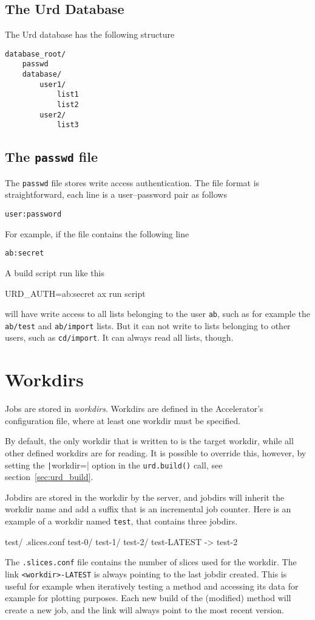 \subsection{The Urd Database}
The Urd database has the following structure
\begin{verbatim}
database_root/
    passwd
    database/
        user1/
            list1
            list2
        user2/
            list3
\end{verbatim}



\subsection{The \texttt{passwd} file}
The \texttt{passwd} file stores write access authentication.  The file
format is straightforward, each line is a user--password pair as follows
\begin{verbatim}
user:password
\end{verbatim}
For example, if the file contains the following line
\begin{verbatim}
ab:secret
\end{verbatim}
A build script run like this
\begin{shell}
URD_AUTH=ab:secret ax run script
\end{shell}
will have write access to all lists belonging to the user \texttt{ab},
such as for example the \texttt{ab/test} and \texttt{ab/import} lists.
But it can not write to lists belonging to other users, such as
\texttt{cd/import}.  It can always read all lists, though.



\section{Workdirs}
Jobs are stored in \textsl{workdirs}.  Workdirs are defined in the
Accelerator's configuration file, where at least one workdir must be
specified.

By default, the only workdir that is written to is the target workdir,
while all other defined workdirs are for reading.  It is possible to
override this, however, by setting the \texttt|workdir=|
option in the \texttt{urd.build()} call, see
section~\ref{sec:urd_build}.

Jobdirs are stored in the workdir by the server, and jobdirs will
inherit the workdir name and add a suffix that is an incremental job
counter.  Here is an example of a workdir named \texttt{test}, that
contains three jobdirs.
\begin{shell}
test/
    .slices.conf
    test-0/
    test-1/
    test-2/
    test-LATEST -> test-2
\end{shell}
The \texttt{.slices.conf} file contains the number of slices used for
the workdir.  The link \texttt{<workdir>-LATEST} is always pointing to
the last jobdir created.  This is useful for example when iteratively
testing a method and accessing its data for example for plotting
purposes.  Each new build of the (modified) method will create a new
job, and the link will always point to the most recent
version.


